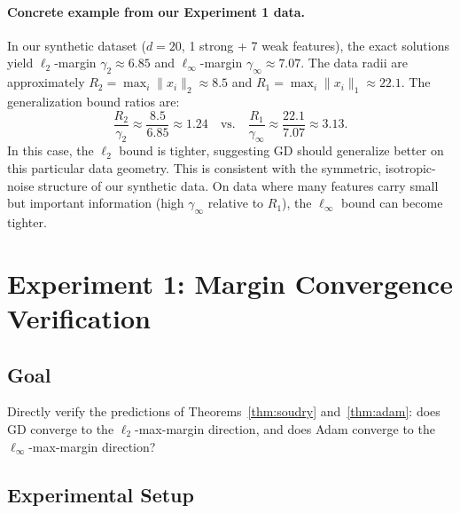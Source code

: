 \documentclass{article}
\begin{document}
\paragraph{Concrete example from our Experiment 1 data.} In our synthetic dataset ($d=20$, 1 strong + 7 weak features), the exact solutions yield $\ell_2$-margin $\gamma_2 \approx 6.85$ and $\ell_\infty$-margin $\gamma_\infty \approx 7.07$. The data radii are approximately $R_2 = \max_i \|x_i\|_2 \approx 8.5$ and $R_1 = \max_i \|x_i\|_1 \approx 22.1$. The generalization bound ratios are:
\begin{equation}
    \frac{R_2}{\gamma_2} \approx \frac{8.5}{6.85} \approx 1.24 \quad \text{vs.} \quad \frac{R_1}{\gamma_\infty} \approx \frac{22.1}{7.07} \approx 3.13.
\end{equation}
In this case, the $\ell_2$ bound is tighter, suggesting GD should generalize better on this particular data geometry. This is consistent with the symmetric, isotropic-noise structure of our synthetic data. On data where many features carry small but important information (high $\gamma_\infty$ relative to $R_1$), the $\ell_\infty$ bound can become tighter.

\section{Experiment 1: Margin Convergence Verification}
\label{sec:exp1}

\subsection{Goal}

Directly verify the predictions of Theorems~\ref{thm:soudry} and~\ref{thm:adam}: does GD converge to the $\ell_2$-max-margin direction, and does Adam converge to the $\ell_\infty$-max-margin direction?

\subsection{Experimental Setup}
\end{document}

